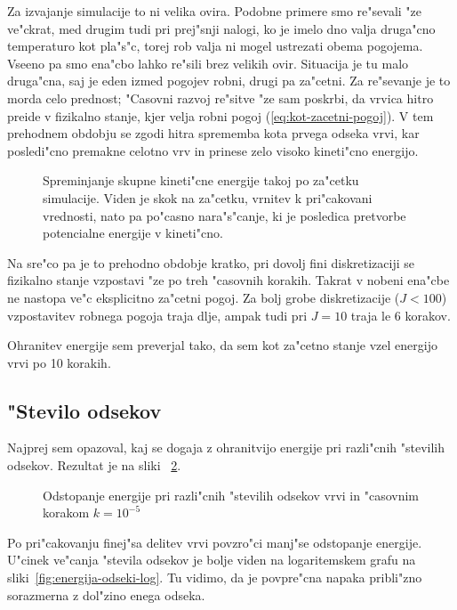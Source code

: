 \documentclass[a4paper,10pt]{article}
\begin{document}
Za izvajanje simulacije to ni velika ovira. Podobne primere smo re"sevali "ze ve"ckrat, med drugim tudi pri prej"snji nalogi, ko je imelo dno valja druga"cno temperaturo kot pla"s"c, torej rob valja ni mogel ustrezati obema pogojema. Vseeno pa smo ena"cbo lahko re"sili brez velikih ovir. Situacija je tu malo druga"cna, saj je eden izmed pogojev robni, drugi pa za"cetni. Za re"sevanje je to morda celo prednost; "Casovni razvoj re"sitve "ze sam poskrbi, da vrvica hitro preide v fizikalno stanje, kjer velja robni pogoj (\ref{eq:kot-zacetni-pogoj}). V tem prehodnem obdobju se zgodi hitra sprememba kota prvega odseka vrvi, kar posledi"cno premakne celotno vrv in prinese zelo visoko kineti"cno energijo. 

\begin{figure}[H]
 
 \caption{Spreminjanje skupne kineti"cne energije takoj po za"cetku simulacije. Viden je skok na za"cetku, vrnitev k pri"cakovani vrednosti, nato pa po"casno nara"s"canje, ki je posledica pretvorbe potencialne energije v kineti"cno. }
 \label{fig:energija-zacetek}
\end{figure}

Na sre"co pa je to prehodno obdobje kratko, pri dovolj fini diskretizaciji se fizikalno stanje vzpostavi "ze po treh "casovnih korakih. Takrat v nobeni ena"cbe ne nastopa ve"c eksplicitno za"cetni pogoj. Za bolj grobe diskretizacije ($J < 100$) vzpostavitev robnega pogoja traja dlje, ampak tudi pri $J=10$ traja le 6 korakov. 

Ohranitev energije sem preverjal tako, da sem kot za"cetno stanje vzel energijo vrvi po 10 korakih. 

\subsection{"Stevilo odsekov}

Najprej sem opazoval, kaj se dogaja z ohranitvijo energije pri razli"cnih "stevilih odsekov. Rezultat je na sliki ~\ref{fig:energija-odseki}. 

\begin{figure}[H]
 
 \caption{Odstopanje energije pri razli"cnih "stevilih odsekov vrvi in "casovnim korakom $k = 10^{-5}$}
 \label{fig:energija-odseki}
\end{figure}

Po pri"cakovanju finej"sa delitev vrvi povzro"ci manj"se odstopanje energije. U"cinek ve"canja "stevila odsekov je bolje viden na logaritemskem grafu na sliki~\ref{fig:energija-odseki-log}. Tu vidimo, da je povpre"cna napaka pribli"zno sorazmerna z dol"zino enega odseka. 
\end{document}
